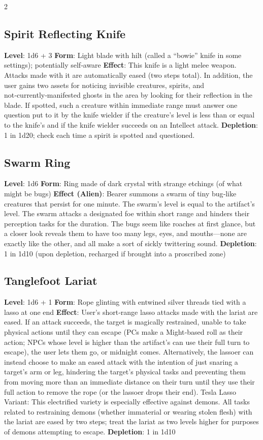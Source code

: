 \begin{multicols}{2}
\subsection{Spirit Reflecting Knife }
\textbf{Level}: 1d6 + 3 
\textbf{Form}: Light blade with hilt (called a “bowie” knife in some settings); potentially self‑aware 
\textbf{Effect}: This knife is a light melee weapon. Attacks made with it are automatically eased (two steps total). 
 In addition, the user gains two assets for noticing invisible creatures, spirits, and not‑currently‑manifested ghosts in the area by looking for their reflection in the blade. If spotted, such a creature within immediate range must answer one question put to it by the knife wielder if the creature’s level is less than or equal to the knife’s and if the knife wielder succeeds on an Intellect attack. 
\textbf{Depletion}: 1 in 1d20; check each time a spirit is spotted and questioned.

\subsection{Swarm Ring}
\textbf{Level}: 1d6 
\textbf{Form}: Ring made of dark crystal with strange etchings (of what might be bugs) 
\textbf{Effect (Alien)}: Bearer summons a swarm of tiny bug‑like creatures that persist for one minute. The swarm’s level is equal to the artifact’s level. The swarm attacks a designated foe within short range and hinders their perception tasks for the duration. 
The bugs seem like roaches at first glance, but a closer look reveals them to have too many legs, eyes, and mouths—none are exactly like the other, and all make a sort of sickly twittering sound. 
\textbf{Depletion}: 1 in 1d10 (upon depletion, recharged if brought into a proscribed zone)

\subsection{Tanglefoot Lariat}
\textbf{Level}: 1d6 + 1 
\textbf{Form}: Rope glinting with entwined silver threads tied with a lasso at one end 
\textbf{Effect}: User’s short‑range lasso attacks made with the lariat are eased. If an attack succeeds, the target is magically restrained, unable to take physical actions until they can escape (PCs make a Might‑based roll as their action; NPCs whose level is higher than the artifact’s can use their full turn to escape), the user lets them go, or midnight comes. 
Alternatively, the lassoer can instead choose to make an eased attack with the intention of just snaring a target’s arm or leg, hindering the target’s physical tasks and preventing them from moving more than an immediate distance on their turn until they use their full action to remove the rope (or the lassoer drops their end). 
Tesla Lasso Variant: This electrified variety is especially effective against demons. All tasks related to restraining demons (whether immaterial or wearing stolen flesh) with the lariat are eased by two steps; treat the lariat as two levels higher for purposes of demons attempting to escape. 
\textbf{Depletion}: 1 in 1d10 


\end{multicols}
